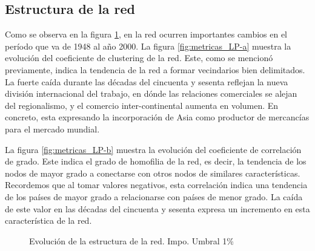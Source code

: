 \documentclass[a4paper]{article}
\begin{document}
\subsection{Estructura de la red}

Como se observa en la figura \ref{fig:metricas_LP}, en la red ocurren importantes cambios en el período que va de 1948 al año 2000. 
La figura \ref{fig:metricas_LP-a} muestra la evolución del coeficiente de clustering de la red. Este, como se mencionó previamente, indica la tendencia de la red a formar vecindarios bien delimitados. La fuerte caída durante las décadas del cincuenta y sesenta reflejan la nueva división internacional del trabajo, en dónde las relaciones comerciales se alejan del regionalismo, y el comercio inter-continental aumenta en volumen. En concreto, esta expresando la incorporación de Asia como productor de mercancías para el mercado mundial. 
\par
La figura \ref{fig:metricas_LP-b} muestra la evolución del coeficiente de correlación de grado. Este indica el grado de homofilia de la red, es decir, la tendencia de los nodos de mayor grado a conectarse con otros nodos de similares características. Recordemos que al tomar valores negativos, esta correlación indica una tendencia de los países de mayor grado a relacionarse con países de menor grado. La caída de este valor en las décadas del cincuenta y sesenta expresa un incremento en esta característica de la red.  

\begin{figure}[h!]
	\centering
	\caption{Evolución de la estructura de la red. Impo. Umbral 1\%}
	\label{fig:metricas_LP}
\end{figure}
\end{document}
